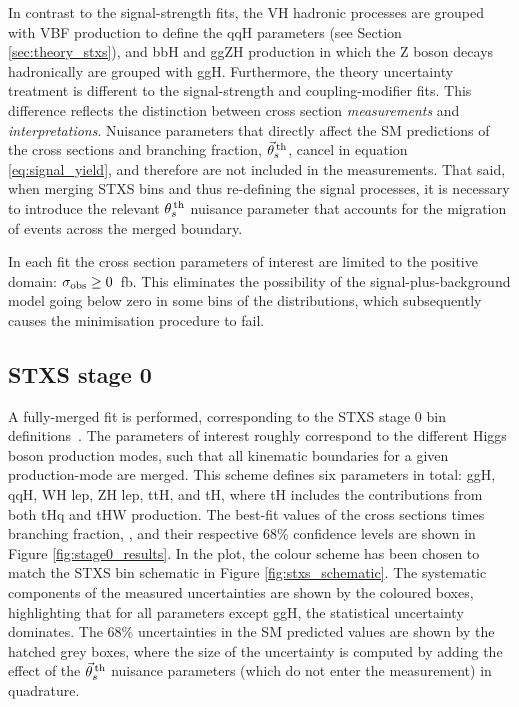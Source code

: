 In contrast to the signal-strength fits, the VH hadronic processes are grouped with VBF production to define the qqH parameters (see Section \ref{sec:theory_stxs}), and bbH and ggZH production in which the Z boson decays hadronically are grouped with ggH. Furthermore, the theory uncertainty treatment is different to the signal-strength and coupling-modifier fits. This difference reflects the distinction between cross section \textit{measurements} and \textit{interpretations}. Nuisance parameters that directly affect the SM predictions of the cross sections and branching fraction, $\vec{\theta}^{\,\rm{th}}_{s}$, cancel in equation \ref{eq:signal_yield}, and therefore are not included in the measurements. That said, when merging STXS bins and thus re-defining the signal processes, it is necessary to introduce the relevant $\theta^{\,\rm{th}}_{s}$ nuisance parameter that accounts for the migration of events across the merged boundary. 

In each fit the cross section parameters of interest are limited to the positive domain: $\sigma_{\rm{obs}}\geq0$~fb. This eliminates the possibility of the signal-plus-background model going below zero in some bins of the \mgg distributions, which subsequently causes the minimisation procedure to fail.

\subsection{STXS stage 0}
A fully-merged fit is performed, corresponding to the STXS stage 0 bin definitions~\cite{deFlorian:2016spz}. The parameters of interest roughly correspond to the different Higgs boson production modes, such that all kinematic boundaries for a given production-mode are merged. This scheme defines six parameters in total: ggH, qqH, WH lep, ZH lep, ttH, and tH, where tH includes the contributions from both tHq and tHW production. The best-fit values of the cross sections times branching fraction, \xsbr, and their respective 68\% confidence levels are shown in Figure \ref{fig:stage0_results}. In the plot, the colour scheme has been chosen to match the STXS bin schematic in Figure \ref{fig:stxs_schematic}. The systematic components of the measured uncertainties are shown by the coloured boxes, highlighting that for all parameters except ggH, the statistical uncertainty dominates. The 68\% uncertainties in the SM predicted values are shown by the hatched grey boxes, where the size of the uncertainty is computed by adding the effect of the $\vec{\theta}^{\,\rm{th}}_{s}$ nuisance parameters (which do not enter the measurement) in quadrature.


